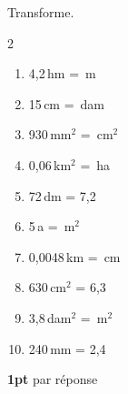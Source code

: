 
\question[10]
Transforme.

\vspace{10pt}
\setlength{\columnsep}{50pt}
\begin{multicols}{2}
\begin{enumerate}[leftmargin=*,align=parleft, label=\alph*), itemsep=15pt]
\item 4,2\,hm = \,m
\item 15\,cm = \,dam
\item 930\,mm$^2$ = \,cm$^2$
\item 0,06\,km$^2$ = \,ha
\item 72\,dm = 7,2\,
\item 5\,a = \,m$^2$
\item 0,0048\,km = \,cm
\item 630\,cm$^2$ = 6,3\,
\item 3,8\,dam$^2$ = \,m$^2$
\item 240\,mm = 2,4\,
\end{enumerate}
\end{multicols}
\setlength{\columnsep}{10pt}

\begin{solution}[0pt]
\textbf{1pt} par réponse
\end{solution}